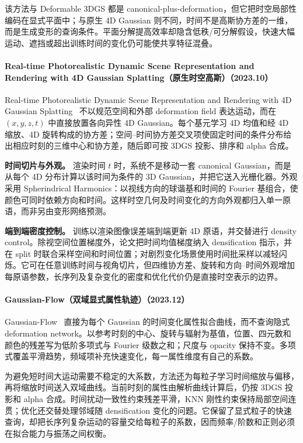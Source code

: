 该方法与 Deformable 3DGS 都是 canonical-plus-deformation，但它把时空局部性编码在显式平面中；与原生 4D Gaussian 则不同，时间不是高斯协方差的一维，而是生成变形的查询条件。平面分解提高效率却隐含低秩/可分解假设，快速大幅运动、遮挡或超出训练时间的变化仍可能使共享特征混叠。

\paragraph{Real-time Photorealistic Dynamic Scene Representation and Rendering with 4D Gaussian Splatting（原生时空高斯）（2023.10）}
Real-time Photorealistic Dynamic Scene Representation and Rendering with 4D Gaussian Splatting~\cite{2310_10642} 不以规范空间和外部 deformation field 表达运动，而在 $(x,y,z,t)$ 中直接放置各向异性 4D Gaussian。每个基元学习 4D 均值和经 4D 缩放、4D 旋转构成的协方差；空间--时间协方差交叉项使固定时间的条件分布给出相应时刻的三维中心和协方差，随后即可按 3DGS 投影、排序和 alpha 合成。

\textbf{时间切片与外观。} 渲染时间 $t$ 时，系统不是移动一套 canonical Gaussian，而是从每个 4D 分布计算以该时间为条件的 3D Gaussian，并把它送入光栅化器。外观采用 Spherindrical Harmonics：以视线方向的球谐基和时间的 Fourier 基组合，使颜色可同时依赖方向和时间。这样时空几何及时间变化的方向外观都归入单一原语，而非另由变形网络预测。

\textbf{端到端密度控制。} 训练以渲染图像误差端到端更新 4D 原语，并交替进行 density control。除视空间位置梯度外，论文把时间均值梯度纳入 densification 指示，并在 split 时联合采样空间和时间位置；对剧烈变化场景使用时间批采样以减轻闪烁。它可在任意训练时间与视角切片，但四维协方差、旋转和方向--时间外观增加每原语参数，长序列及复杂变化的密度和优化代价仍是直接时空表示的边界。

\paragraph{Gaussian-Flow（双域显式属性轨迹）（2023.12）}
Gaussian-Flow~\cite{2312_03431} 直接为每个 Gaussian 的时间变化属性拟合曲线，而不查询隐式 deformation network。以参考时刻的中心、旋转与辐射为基值，位置、四元数和颜色的残差写为低阶多项式与 Fourier 级数之和；尺度与 opacity 保持不变。多项式覆盖平滑趋势，频域项补充快速变化，每一属性维度有自己的系数。

为避免短时间大运动需要不稳定的大系数，方法还为每粒子学习时间缩放与偏移，再将缩放时间送入双域曲线。当前时刻的属性由解析曲线计算后，仍按 3DGS 投影和 alpha 合成。时间扰动一致性约束残差平滑，KNN 刚性约束保持局部空间连贯；优化还交替处理邻域随 densification 变化的问题。它保留了显式粒子的快速查询，却把长序列复杂运动的容量交给每粒子的系数，因而频率/阶数和正则必须在拟合能力与振荡之间权衡。


